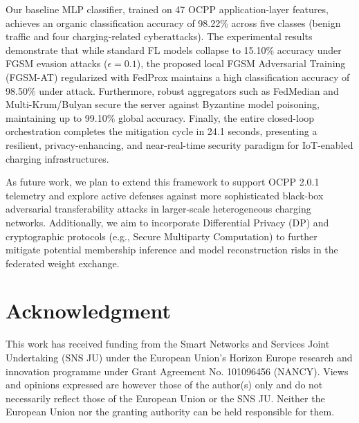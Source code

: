 \documentclass[10pt, a4paper, conference]{IEEEtran}
\begin{document}
Our baseline MLP classifier, trained on 47 OCPP application-layer features, achieves an organic classification accuracy of 98.22\% across five classes (benign traffic and four charging-related cyberattacks). The experimental results demonstrate that while standard FL models collapse to 15.10\% accuracy under FGSM evasion attacks ($\epsilon = 0.1$), the proposed local FGSM Adversarial Training (FGSM-AT) regularized with FedProx maintains a high classification accuracy of 98.50\% under attack. Furthermore, robust aggregators such as FedMedian and Multi-Krum/Bulyan secure the server against Byzantine model poisoning, maintaining up to 99.10\% global accuracy. Finally, the entire closed-loop orchestration completes the mitigation cycle in 24.1 seconds, presenting a resilient, privacy-enhancing, and near-real-time security paradigm for IoT-enabled charging infrastructures.

As future work, we plan to extend this framework to support OCPP 2.0.1 telemetry and explore active defenses against more sophisticated black-box adversarial transferability attacks in larger-scale heterogeneous charging networks. Additionally, we aim to incorporate Differential Privacy (DP) and cryptographic protocols (e.g., Secure Multiparty Computation) to further mitigate potential membership inference and model reconstruction risks in the federated weight exchange.

\section*{Acknowledgment}
This work has received funding from the Smart Networks and Services Joint Undertaking (SNS JU) under the European Union's Horizon Europe research and innovation programme under Grant Agreement No. 101096456 (NANCY). Views and opinions expressed are however those of the author(s) only and do not necessarily reflect those of the European Union or the SNS JU. Neither the European Union nor the granting authority can be held responsible for them.



\end{document}
